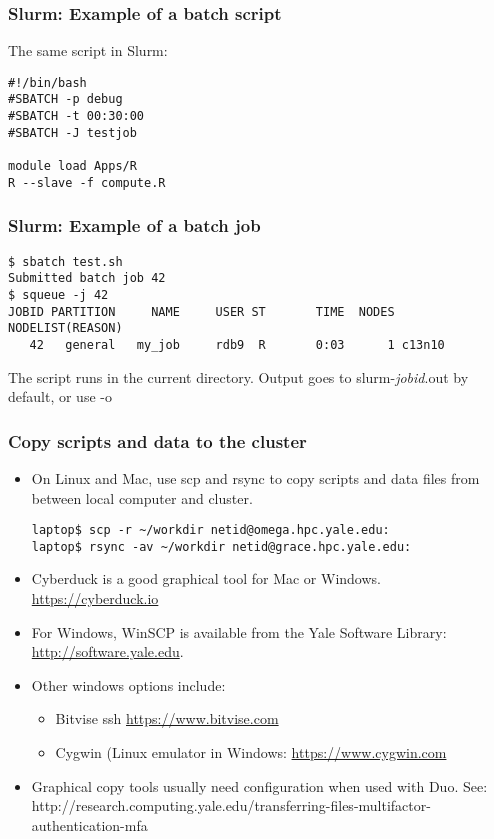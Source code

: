 \documentclass[10pt]{beamer}
\newcommand\smallfont{\fontsize{8pt}{7.2}\selectfont}
\newcommand\regfont{\fontsize{10pt}{7.2}\selectfont}
\begin{document}
\begin{frame}[fragile]
\frametitle{Slurm: Example of a batch script}
The same script in Slurm:

\begin{block}{}
\begin{verbatim}
#!/bin/bash
#SBATCH -p debug 
#SBATCH -t 00:30:00  
#SBATCH -J testjob

module load Apps/R
R --slave -f compute.R
\end{verbatim}
\end{block}{}
\end{frame}

\begin{frame}[fragile]
\frametitle{Slurm: Example of a batch job}
\smallfont
\begin{verbatim}
$ sbatch test.sh
Submitted batch job 42
$ squeue -j 42
JOBID PARTITION     NAME     USER ST       TIME  NODES NODELIST(REASON)
   42   general   my_job     rdb9  R       0:03      1 c13n10
\end{verbatim}
\vskip14pt
\regfont
The script runs in the current directory.  
Output goes to slurm-\textit{jobid}.out by default, or use -o
\end{frame}



\begin{frame}[fragile]
\frametitle{Copy scripts and data to the cluster}
\begin{itemize}
\item On Linux and Mac, use scp and rsync
to copy scripts and data files from between local computer and cluster.

\begin{verbatim}
laptop$ scp -r ~/workdir netid@omega.hpc.yale.edu:
laptop$ rsync -av ~/workdir netid@grace.hpc.yale.edu:
\end{verbatim}

\item Cyberduck is a good graphical tool for Mac or Windows.  \url{https://cyberduck.io}

\item For Windows, WinSCP is available from the Yale Software
Library: \url{http://software.yale.edu}.


\item Other windows options include:
\begin{itemize}
\item Bitvise ssh \url{https://www.bitvise.com}
\item Cygwin (Linux emulator in Windows: \url{https://www.cygwin.com}
\end{itemize}
\item Graphical copy tools usually need configuration when used with Duo.  See:
http://research.computing.yale.edu/transferring-files-multifactor-authentication-mfa
\end{itemize}

\end{frame}
\end{document}

